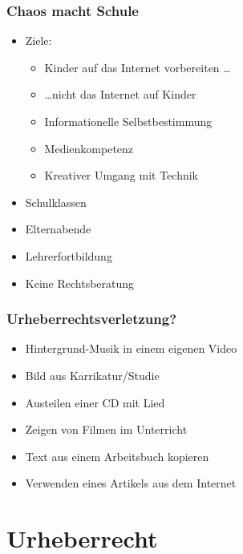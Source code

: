 \documentclass{beamer}
\begin{document}
\begin{frame}
    \frametitle{Chaos macht Schule}
    \begin{itemize}
        \item<2->Ziele:
            \begin{itemize}
                \item<3-> Kinder auf das Internet vorbereiten \ldots
                \item<4-> \ldots nicht das Internet auf Kinder
                \item<5-> Informationelle Selbstbestimmung
                \item<6-> Medienkompetenz
                \item<7-> Kreativer Umgang mit Technik
            \end{itemize}
        \item<8-> Schulklassen
        \item<9-> Elternabende
        \item<10-> Lehrerfortbildung
        \item<11-> Keine Rechtsberatung
    \end{itemize}
\end{frame}

\begin{frame}
    \frametitle{Urheberrechtsverletzung?}
    \begin{itemize}
        \item<1-> Hintergrund-Musik in einem eigenen Video
        \item<2-> Bild aus Karrikatur/Studie
        \item<3-> Austeilen einer CD mit Lied
        \item<4-> Zeigen von Filmen im Unterricht
        \item<5-> Text aus einem Arbeitsbuch kopieren
        \item<6-> Verwenden eines Artikels aus dem Internet
    \end{itemize}
\end{frame}

\section{Urheberrecht}
\end{document}
